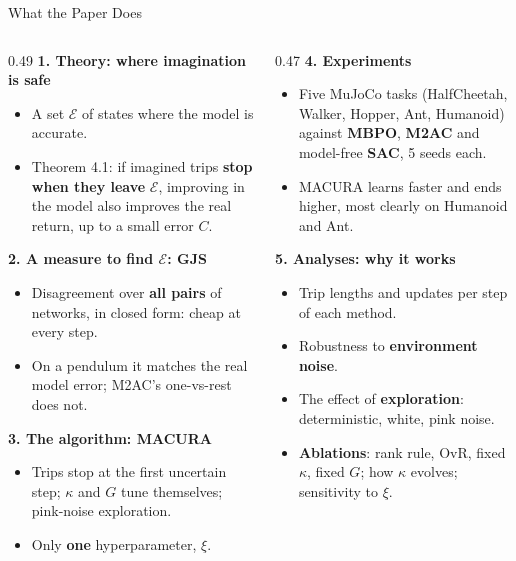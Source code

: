 \documentclass[aspectratio=169,10pt]{beamer}
\newcommand{\E}{\mathcal{E}}
\begin{document}
\begin{frame}{What the Paper Does}
  \footnotesize
  \begin{columns}[T]
    \begin{column}{0.49\textwidth}
      \textbf{1. Theory: where imagination is safe}
      \begin{itemize}
        \item A set $\E$ of states where the model is accurate.
        \item Theorem 4.1: if imagined trips \textbf{stop when they leave} $\E$, improving in the model also improves
              the real return, up to a small error $C$.
      \end{itemize}
      \textbf{2. A measure to find $\E$: GJS}
      \begin{itemize}
        \item Disagreement over \textbf{all pairs} of networks, in closed form: cheap at every step.
        \item On a pendulum it matches the real model error; M2AC's one-vs-rest does not.
      \end{itemize}
      \textbf{3. The algorithm: MACURA}
      \begin{itemize}
        \item Trips stop at the first uncertain step; $\kappa$ and $G$ tune themselves; pink-noise exploration.
        \item Only \textbf{one} hyperparameter, $\xi$.
      \end{itemize}
    \end{column}
    \begin{column}{0.47\textwidth}
      \textbf{4. Experiments}
      \begin{itemize}
        \item Five MuJoCo tasks (HalfCheetah, Walker, Hopper, Ant, Humanoid) against \textbf{MBPO}, \textbf{M2AC}
              and model-free \textbf{SAC}, 5 seeds each.
        \item MACURA learns faster and ends higher, most clearly on Humanoid and Ant.
      \end{itemize}
      \textbf{5. Analyses: why it works}
      \begin{itemize}
        \item Trip lengths and updates per step of each method.
        \item Robustness to \textbf{environment noise}.
        \item The effect of \textbf{exploration}: deterministic, white, pink noise.
        \item \textbf{Ablations}: rank rule, OvR, fixed $\kappa$, fixed $G$; how $\kappa$ evolves; sensitivity to $\xi$.
      \end{itemize}
    \end{column}
  \end{columns}
\end{frame}
\end{document}

